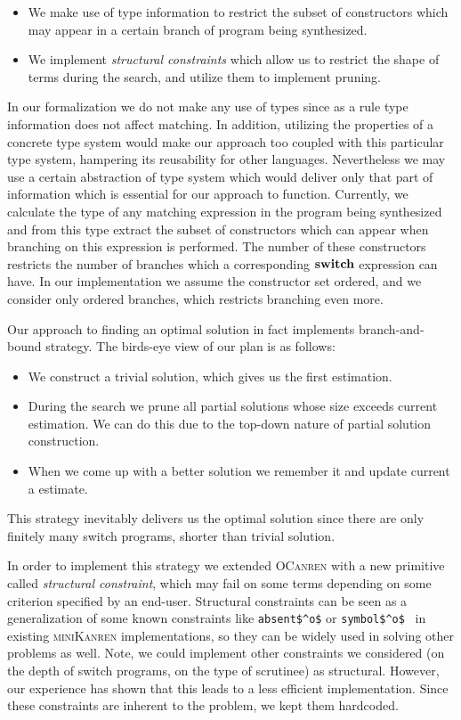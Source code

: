 \begin{itemize}
\item We make use of type information to restrict the subset of constructors which may appear in a certain branch of
  program being synthesized.
\item We implement \emph{structural constraints} which allow us to restrict the shape of terms during the search, and
  utilize them to implement pruning.  
\end{itemize}

In our formalization we do not make any use of types since as a rule type information does not affect matching. In addition,
utilizing the properties of a concrete type system would make our approach too coupled with this particular type system, hampering
its reusability for other languages. Nevertheless we may use a certain abstraction of type system which would deliver only
that part of information which is essential for our approach to function. Currently, we calculate the type of any matching expression in
the program being synthesized and from this type extract the subset of constructors which can appear when branching on this expression
is performed. The number of these constructors restricts the number of branches which a corresponding $\mathbf{switch}$ expression can have.
In our implementation we assume the constructor set ordered, and we consider only ordered branches, which restricts branching even more.

Our approach to finding an optimal solution in fact implements branch-and-bound strategy. The birds-eye view of our plan is as follows:

\begin{itemize}
\item We construct a trivial solution, which gives us the first estimation.
\item During the search we prune all partial solutions whose size exceeds current estimation. We can do this due to
  the top-down nature of partial solution construction.
\item When we come up with a better solution we remember it and update current a estimate.
\end{itemize}

\noindent This strategy inevitably delivers us the optimal solution since there are only finitely many switch programs, shorter than trivial solution.

In order to implement this strategy we extended \textsc{OCanren} with a new primitive called \emph{structural constraint}, which may
fail on some terms depending on some criterion specified by an end-user. Structural constraints can be seen as a generalization of
some known constraints like \lstinline|absent$^o$| or \lstinline|symbol$^o$|~\cite{Untagged} in existing \textsc{miniKanren} implementations, 
so they can be widely used in solving other problems as well. Note, we could implement other constraints we considered (on the
depth of switch programs, on the type of scrutinee) as structural.
However, our experience has shown that this leads to
a less efficient implementation. Since these constraints are inherent to the problem, we kept them hardcoded.


